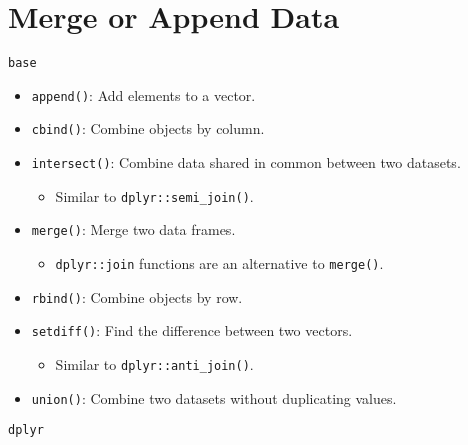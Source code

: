 \documentclass[]{book}
\providecommand{\tightlist}{%
  \setlength{\itemsep}{0pt}\setlength{\parskip}{0pt}}
\begin{document}
\hypertarget{merge-or-append-data}{%
\section{Merge or Append Data}\label{merge-or-append-data}}

\texttt{base}

\begin{itemize}
\tightlist
\item
  \texttt{append()}: Add elements to a vector.
\item
  \texttt{cbind()}: Combine objects by column.
\item
  \texttt{intersect()}: Combine data shared in common between two datasets.

  \begin{itemize}
  \tightlist
  \item
    Similar to \texttt{dplyr::semi\_join()}.
  \end{itemize}
\item
  \texttt{merge()}: Merge two data frames.

  \begin{itemize}
  \tightlist
  \item
    \texttt{dplyr::join} functions are an alternative to \texttt{merge()}.
  \end{itemize}
\item
  \texttt{rbind()}: Combine objects by row.
\item
  \texttt{setdiff()}: Find the difference between two vectors.

  \begin{itemize}
  \tightlist
  \item
    Similar to \texttt{dplyr::anti\_join()}.
  \end{itemize}
\item
  \texttt{union()}: Combine two datasets without duplicating values.
\end{itemize}

\texttt{dplyr}
\end{document}
